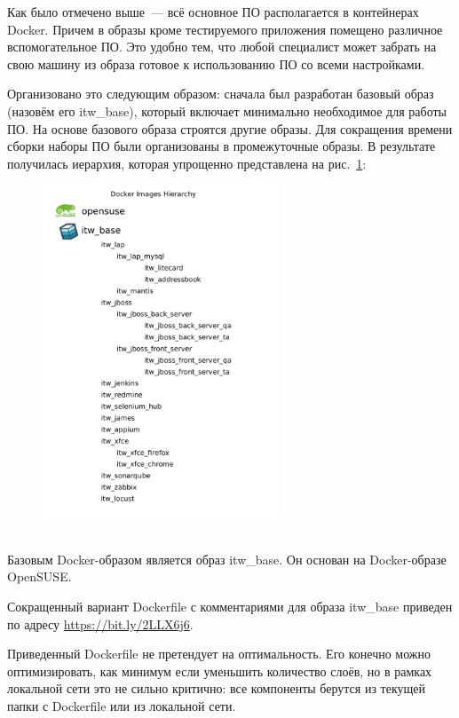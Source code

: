 \documentclass[10pt, a5paper]{article}
\begin{document}
Как было отмечено выше~--- всё основное ПО располагается в контейнерах Docker. Причем в образы кроме тестируемого приложения помещено различное вспомогательное ПО. Это удобно тем, что любой специалист может забрать на свою машину из образа готовое к использованию ПО со всеми настройками.

Организовано это следующим образом: сначала был разработан базовый образ (назовём его itw\_base), который включает минимально необходимое для работы ПО. На основе базового образа строятся другие образы. Для сокращения времени сборки наборы ПО были организованы в промежуточные образы. В результате получилась иерархия, которая упрощенно представлена на рис.~\ref{Gagarin3}:

\begin{center}
\begin{figure}[h!]
  \centering
  \includegraphics[width=7cm]{13_2018_Gagarin3}
  \caption{~}
  \label{Gagarin3}
\end{figure}
\end{center} 

Базовым Docker-образом является образ itw\_base. Он основан на Docker-образе OpenSUSE.

Сокращенный вариант Dockerfile с комментариями для образа itw\_base приведен по адресу \url{https://bit.ly/2LLX6j6}.

Приведенный Dockerfile не претендует на оптимальность. Его конечно можно оптимизировать, как минимум если уменьшить количество слоёв, но в рамках локальной сети это не сильно критично: все компоненты берутся из текущей папки с Dockerfile или из локальной сети.
\end{document}

